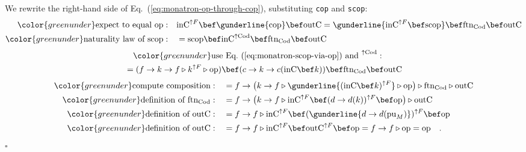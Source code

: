 We rewrite the right-hand side of Eq.~(\ref{eq:monatron-op-through-cop}),
substituting \lstinline!cop! and \lstinline!scop!:
\begin{align*}
{\color{greenunder}\text{expect to equal }\text{op}:}\quad & \text{inC}^{\uparrow F}\bef\gunderline{\text{cop}}\bef\text{outC}=\gunderline{\text{inC}^{\uparrow F}\bef\text{scop}}\bef\text{ftn}_{\text{Cod}}\bef\text{outC}\\
{\color{greenunder}\text{naturality law of }\text{scop}:}\quad & =\text{scop}\bef\text{inC}^{\uparrow\text{Cod}}\bef\text{ftn}_{\text{Cod}}\bef\text{outC}
\end{align*}
\begin{align*}
 & \quad{\color{greenunder}\text{use Eq.~(\ref{eq:monatron-scop-via-op}) and }^{\uparrow\text{Cod}}:}\quad\\
 & =(f\rightarrow k\rightarrow f\triangleright k^{\uparrow F}\triangleright\text{op})\bef(c\rightarrow k\rightarrow c(\text{inC}\bef k))\bef\text{ftn}_{\text{Cod}}\bef\text{outC}
\end{align*}
\begin{align*}
{\color{greenunder}\text{compute composition}:}\quad & =f\rightarrow\big(k\rightarrow f\triangleright\gunderline{(\text{inC}\bef k)^{\uparrow F}}\triangleright\text{op}\big)\triangleright\text{ftn}_{\text{Cod}}\triangleright\text{outC}\\
{\color{greenunder}\text{definition of }\text{ftn}_{\text{Cod}}:}\quad & =f\rightarrow\big(k\rightarrow f\triangleright\text{inC}^{\uparrow F}\bef(d\rightarrow d(k))^{\uparrow F}\bef\text{op}\big)\triangleright\text{outC}\\
{\color{greenunder}\text{definition of }\text{outC}:}\quad & =f\rightarrow f\triangleright\text{inC}^{\uparrow F}\bef(\gunderline{d\rightarrow d(\text{pu}_{M})})^{\uparrow F}\bef\text{op}\\
{\color{greenunder}\text{definition of }\text{outC}:}\quad & =f\rightarrow f\triangleright\text{inC}^{\uparrow F}\bef\text{outC}^{\uparrow F}\bef\text{op}=f\rightarrow f\triangleright\text{op}=\text{op}\quad.
\end{align*}
$\square$

